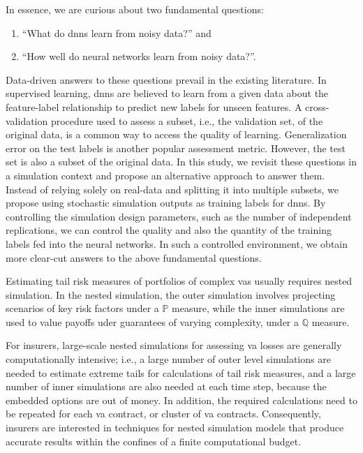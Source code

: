 In essence, we are curious about two fundamental questions:
\begin{enumerate}
    \item ``What do \gls{dnn}s learn from noisy data?'' and 
    \item ``How well do neural networks learn from noisy data?''.
\end{enumerate}
Data-driven answers to these questions prevail in the existing literature.
In supervised learning, \gls{dnn}s are believed to learn from a given data about the feature-label relationship to predict new labels for unseen features.
A cross-validation procedure used to assess a subset, i.e., the validation set, of the original data, is a common way to access the quality of learning.
Generalization error on the test labels is another popular assessment metric.
However, the test set is also a subset of the original data.
In this study, we revisit these questions in a simulation context and propose an alternative approach to answer them.
Instead of relying solely on real-data and splitting it into multiple subsets, we propose using stochastic simulation outputs as training labels for \gls{dnn}s.
By controlling the simulation design parameters, such as the number of independent replications, we can control the quality and also the quantity of the training labels fed into the neural networks.
In such a controlled environment, we obtain more clear-cut answers to the above fundamental questions.

Estimating tail risk measures of portfolios of complex \gls{va}s usually requires nested simulation.
In the nested simulation, the outer simulation involves projecting scenarios of key risk factors under a $\mathbb{P}$ measure, while the inner simulations are used to value payoffs uder guarantees of varying complexity, under a $\mathbb{Q}$ measure.

For insurers, large-scale nested simulations for assessing \gls{va} losses are generally computationally intensive; i.e., a large number of outer level simulations are needed to estimate extreme tails for calculations of tail risk measures, and a large number of inner simulations are also needed at each time step, because the embedded options are out of money. 
In addition, the required calculations need to be repeated for each \gls{va} contract, or cluster of \gls{va} contracts.
Consequently, insurers are interested in techniques for nested simulation models that produce accurate results within the confines of a finite computational budget.


